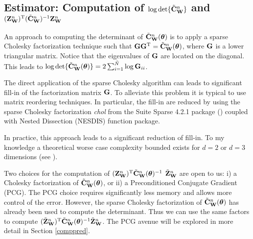 \documentclass[11pt,final]{amsart}       %
\begin{document}
\subsection{Estimator: Computation of 
$\log{\det\{ \tilde{\mathbf{C}}^n_{\mathbf{W}}\}}$ and $(\mathbf{Z}^n_{\mathbf{W}})^{\rm T}
  (\tilde{\mathbf{C}}^n_{\mathbf{W}})^{-1}\mathbf{Z}^n_{\mathbf{W}}$}

An approach to computing the determinant of
$\tilde{\mathbf{C}}^n_{\mathbf{W}}(\boldsymbol{\theta})$ is to apply a sparse Cholesky
factorization technique such that $\mathbf{G}\mathbf{G}^{\rm T} =
\tilde{\mathbf{C}}^n_{\mathbf{W}}(\boldsymbol{\theta})$, where $\mathbf{G}$ is a lower triangular
matrix. Notice that the eigenvalues of $\mathbf{G}$ are located on the
diagonal. This leads to $\log \det \{\tilde{\mathbf{C}}^n_{\mathbf{W}}(\boldsymbol{\theta})\} =
2 \sum_{i = 1}^{\tilde{N}} \log{\mathbf{G}_{ii}}$.

The direct application of the sparse Cholesky algorithm can leads to
significant fill-in of the factorization matrix $\mathbf{G}$. To alleviate
this problem it is typical to use matrix reordering techniques. In
particular, the fill-in are reduced by using the sparse Cholesky
factorization \emph{chol} from the Suite Sparse 4.2.1 package
(\cite{Chen2008,Davis2009,Davis2005,Davis2001,Davis1999}) coupled with
Nested Dissection (NESDIS) function package.

In practice, this approach leads to a significant reduction of
fill-in. To my knowledge a theoretical worse case complexity bounded
exists for $d = 2$ or $d = 3$ dimensions (see \cite{Castrillon2015}).

Two choices for the computation of $(\mathbf{Z}^n_{\mathbf{W}}) ^{\rm T} \tilde
{\mathbf{C}}^n_{\mathbf{W}}(\boldsymbol{\theta})^{-1}$  $\tilde {\mathbf{Z}}^n_{\mathbf{W}}$ are open to us: i) a
Cholesky factorization of $\tilde{\mathbf{C}}^n_{\mathbf{W}}(\boldsymbol{\theta})$, or ii) a
Preconditioned Conjugate Gradient (PCG).  The PCG choice requires
significantly less memory and allows more control of the error.
However, the sparse Cholesky factorization of
$\tilde{\mathbf{C}}^n_{\mathbf{W}}(\boldsymbol{\theta})$ has already been used to compute the
determinant. Thus we can use the same factors to compute $ (\tilde
{\mathbf{Z}}_{\mathbf{W}}^n) ^{\rm T}\tilde{\mathbf{C}}^n_{\mathbf{W}}(\boldsymbol{\theta})^{-1} \tilde {\mathbf{Z}}^n_{\mathbf{W}}$.
The PCG avenue will be explored in more detail in Section
\ref{comppred}.




\end{document}
